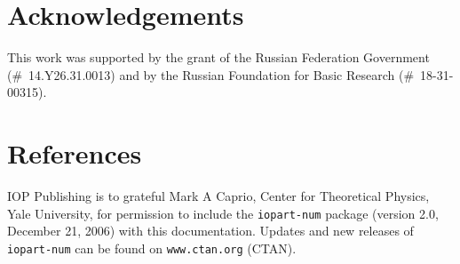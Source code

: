 \documentclass[a4paper]{jpconf}
\begin{document}
\section*{Acknowledgements}

This work was supported by the grant of the Russian Federation Government (\#~14.Y26.31.0013) and by the Russian Foundation for Basic Research (\#~18-31-00315).

\section*{References}
\begin{thebibliography}{9}
 IOP Publishing is to grateful Mark A Caprio, Center for Theoretical Physics, Yale University, for permission to include the {\tt iopart-num} \BibTeX package (version 2.0, December 21, 2006) with  this documentation. Updates and new releases of {\tt iopart-num} can be found on \verb"www.ctan.org" (CTAN). 
\end{thebibliography}
\end{document}
